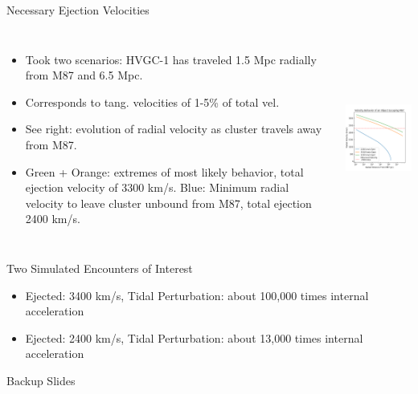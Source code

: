\documentclass[aspectratio=169]{beamer}
\begin{document}
\begin{frame}
  {Necessary Ejection Velocities}
  \begin{columns}
    \begin{itemize}
      \item Took two scenarios: HVGC-1 has traveled 1.5 Mpc radially from M87 and 6.5 Mpc. 
      \item Corresponds to tang. velocities of 1-5\% of total vel. 
      \item See right: evolution of radial velocity as cluster travels away from M87.
      \item Green + Orange: extremes of most likely behavior, total ejection velocity of 3300 km/s. Blue: Minimum radial velocity to leave cluster unbound from M87, total ejection 2400 km/s.
    \end{itemize}
    \includegraphics[width=6.4cm, height=6.4cm]{./Images/velocity_behavior.png}
    \centering
  \end{columns}
\end{frame}

\begin{frame}
  {Two Simulated Encounters of Interest}
  \begin{itemize}
    \item Ejected: 3400 km/s, Tidal Perturbation: about 100,000 times internal acceleration
    \item Ejected: 2400 km/s, Tidal Perturbation: about 13,000 times internal acceleration
  \end{itemize}

\end{frame}

\backupbegin

\begin{frame}
  {}
  \begin{center}
    \Huge Backup Slides
  \end{center}
\end{frame}
\end{document}

